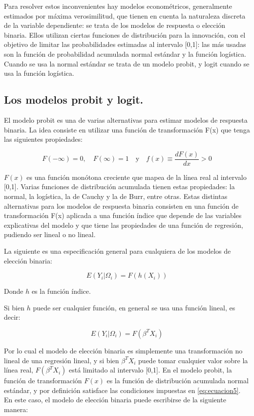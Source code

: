 \documentclass[
  12pt,
]{krantz}
\theoremstyle{definition}
\theoremstyle{definition}
\theoremstyle{definition}
\theoremstyle{remark}
\begin{document}
Para resolver estos inconvenientes hay modelos econométricos, generalmente estimados por máxima verosimilitud, que tienen en cuenta la naturaleza discreta de la variable dependiente: se trata de los modelos de respuesta o elección binaria. Ellos utilizan ciertas funciones de distribución para la innovación, con el objetivo de limitar las probabilidades estimadas al intervalo {[}0,1{]}: las más usadas son la función de probabilidad acumulada normal estándar y la función logística. Cuando se usa la normal estándar se trata de un modelo probit, y logit cuando se usa la función logística.

\hypertarget{los-modelos-probit-y-logit.}{%
\subsection{Los modelos probit y logit.}\label{los-modelos-probit-y-logit.}}

El modelo probit es una de varias alternativas para estimar modelos de respuesta binaria. La idea consiste en utilizar una función de transformación F(x) que tenga las siguientes propiedades:

\[F(-\infty)=0, \quad F(\infty)=1\quad\textrm{y}\quad f(x)\equiv\frac{dF(x)}{dx}>0
\label{eq:ecuacion5}\]

\(F(x)\) es una función monótona creciente que mapea de la línea real al intervalo {[}0,1{]}. Varias funciones de distribución acumulada tienen estas propiedades: la normal, la logística, la de Cauchy y la de Burr, entre otras. Estas distintas alternativas para los modelos de respuesta binaria consisten en una función de transformación F(x) aplicada a una función índice que depende de las variables explicativas del modelo y que tiene las propiedades de una función de regresión, pudiendo ser lineal o no lineal.

La siguiente es una especificación general para cualquiera de los modelos de elección binaria:

\[E(Y_i|\Omega_i)=F(h(X_i))
\label{eq:ecuacion6}\]

Donde \(h\) es la función índice.

Si bien \(h\) puede ser cualquier función, en general se usa una función lineal, es decir:

\[E(Y_i|\Omega_i)=F(\beta^TX_i)
\label{eq:ecuacion7}\]

Por lo cual el modelo de elección binaria es simplemente una transformación no lineal de una regresión lineal, y si bien \(\beta^TX_i\) puede tomar cualquier valor sobre la línea real, \(F(\beta^TX_i)\) está limitado al intervalo {[}0,1{]}. En el modelo probit, la función de transformación \(F(x)\) es la función de distribución acumulada normal estándar, y por definición satisface las condiciones impuestas en \eqref{eq:ecuacion5}. En este caso, el modelo de elección binaria puede escribirse de la siguiente manera:
\end{document}
